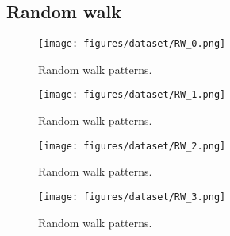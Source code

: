 \subsection{Random walk}
\begin{figure}[H]
    \centering
    \texttt{[image: figures/dataset/RW\_0.png]}
    \caption{Random walk patterns.}
    \label{fig:R0}
\end{figure}
\begin{figure}[H]
    \centering
    \texttt{[image: figures/dataset/RW\_1.png]}
    \caption{Random walk patterns.}
    \label{fig:R1}
\end{figure}
\begin{figure}[H]
    \centering
    \texttt{[image: figures/dataset/RW\_2.png]}
    \caption{Random walk patterns.}
    \label{fig:R2}
\end{figure}
\begin{figure}[H]
    \centering
    \texttt{[image: figures/dataset/RW\_3.png]}
    \caption{Random walk patterns.}
    \label{fig:R3}
\end{figure}


